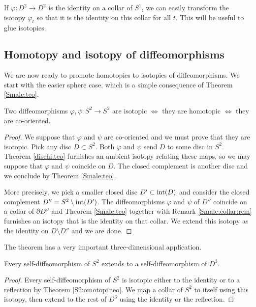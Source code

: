 \begin{oss} \label{Smale:collar:rem}
If $\varphi\colon D^2 \to D^2$ is the identity on a collar of $S^1$, we can easily transform the isotopy $\varphi_t$ so that it is the identity on this collar for all $t$. This will be useful to glue isotopies.
\end{oss}

\subsection{Homotopy and isotopy of diffeomorphisms}
We are now ready to promote homotopies to isotopies of diffeomorphisms. We start with the easier sphere case, which is a simple consequence of Theorem \ref{Smale:teo}.

\begin{teo} \label{S2:omotopi:teo}
Two diffeomorphisms $\varphi, \psi\colon S^2 \to S^2$ are isotopic $\Longleftrightarrow$ they are homotopic $\Longleftrightarrow$ they are co-oriented.
\end{teo}
\begin{proof}
We suppose that $\varphi$ and $\psi$ are co-oriented and we must prove that they are isotopic. Pick any disc $D\subset S^2$. Both $\varphi$ and $\psi$ send $D$ to some disc in $S^2$. Theorem \ref{dischi:teo} furnishes an ambient isotopy relating these maps, so we may suppose that $\varphi$ and $\psi$ coincide on $D$. The closed complement is another disc and we conclude by Theorem \ref{Smale:teo}.

More precisely, we pick a smaller closed disc $D' \subset {\rm int}(D)$ and consider the closed complement $D'' = S^2\setminus {\rm int}(D')$. The diffeomorphisms $\varphi$ and $\psi$ of $D''$ coincide on a collar of $\partial D''$ and Theorem \ref{Smale:teo} together with Remark \ref{Smale:collar:rem} furnishes an isotopy that is the identity on that collar. We extend this isotopy as the identity on $D\setminus D''$ and we are done.
\end{proof}

The theorem has a very important three-dimensional application.

\begin{cor} 
Every self-diffeomorphism of $S^2$ extends to a self-diffeomorphism of $D^3$.
\end{cor}
\begin{proof}
Every self-diffeomorphism of $S^2$ is isotopic either to the identity or to a reflection by Theorem \ref{S2:omotopi:teo}. We map a collar of $S^2$ to itself using this isotopy, then extend to the rest of $D^3$ using the identity or the reflection.
\end{proof}

